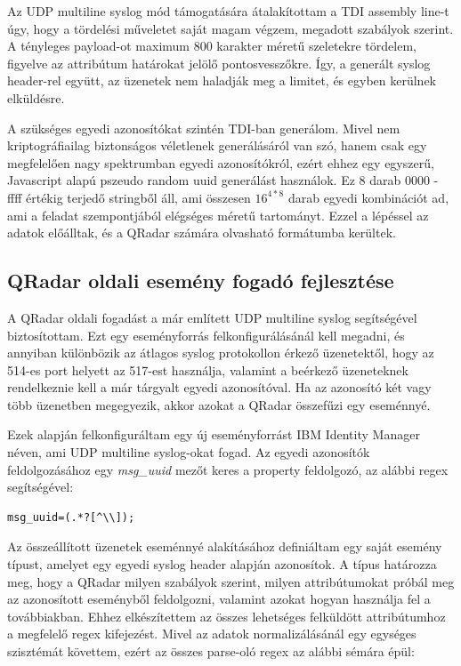 Az UDP multiline syslog mód támogatására átalakítottam a TDI assembly line-t úgy, hogy a tördelési műveletet saját magam végzem, megadott szabályok szerint. A tényleges payload-ot maximum 800 karakter méretű szeletekre tördelem, figyelve az attribútum határokat jelölő pontosvesszőkre. Így, a generált syslog header-rel együtt, az üzenetek nem haladják meg a limitet, és egyben kerülnek elküldésre. 

A szükséges egyedi azonosítókat szintén TDI-ban generálom. Mivel nem kriptográfiailag biztonságos véletlenek generálásáról van szó, hanem csak egy megfelelően nagy spektrumban egyedi azonosítókról, ezért ehhez egy egyszerű, Javascript alapú pszeudo random uuid generálást használok. Ez 8 darab 0000 - ffff értékig terjedő stringből áll, ami összesen $16^{4 * 8} $ darab egyedi kombinációt ad, ami a feladat szempontjából elégséges méretű tartományt. Ezzel a lépéssel az adatok előálltak, és a QRadar számára olvasható formátumba kerültek.


\subsection{QRadar oldali esemény fogadó fejlesztése}

A QRadar oldali fogadást a már említett UDP multiline syslog segítségével biztosítottam. Ezt egy eseményforrás felkonfigurálásánál kell megadni, és annyiban különbözik az átlagos syslog protokollon érkező üzenetektől, hogy az 514-es port helyett az 517-est használja, valamint a beérkező üzeneteknek rendelkeznie kell a már tárgyalt egyedi azonosítóval. Ha az azonosító két vagy több üzenetben megegyezik, akkor azokat a QRadar összefűzi egy eseménnyé.

Ezek alapján felkonfiguráltam egy új eseményforrást IBM Identity Manager néven, ami UDP multiline syslog-okat fogad. Az egyedi azonosítók feldolgozásához egy \textit{msg\_uuid} mezőt keres a property feldolgozó, az alábbi regex segítségével: 

\begin{lstlisting}
msg_uuid=(.*?[^\\]);
\end{lstlisting}

Az összeállított üzenetek eseménnyé alakításához definiáltam egy saját esemény típust, amelyet egy egyedi syslog header alapján azonosítok. A típus határozza meg, hogy a QRadar milyen szabályok szerint, milyen attribútumokat próbál meg az azonosított eseményből feldolgozni, valamint azokat hogyan használja fel a továbbiakban. Ehhez elkészítettem az összes lehetséges felküldött attribútumhoz a megfelelő regex kifejezést. Mivel az adatok normalizálásánál egy egységes szisztémát követtem, ezért az összes parse-oló regex az alábbi sémára épül:

